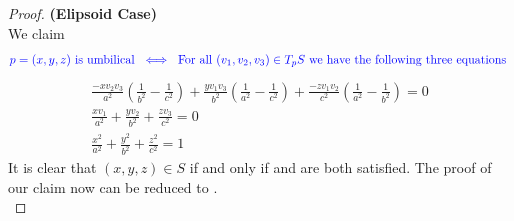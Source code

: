 \documentclass{report}
\begin{document}
\begin{proof}
\textbf{(Elipsoid Case)}\\

We claim 
\begin{align*}
  \textcolor{blue}{p=(x,y,z)\text{ is umbilical }\iff \text{ For all $(v_1,v_2,v_3)\in T_pS$ we have the following three equations }}
\end{align*}
\begin{align}
  \frac{-x v_2v_3}{a^2}(\frac{1}{b^2}-\frac{1}{c^2})+ \frac{yv_1v_3}{b^2}(\frac{1}{a^2}-\frac{1}{c^2})+ \frac{-zv_1v_2}{c^2}(\frac{1}{a^2}-\frac{1}{b^2})=0\label{eq1}\\
  \frac{xv_1}{a^2}+\frac{yv_2}{b^2}+ \frac{zv_3}{c^2}=0\label{eq2}\\
  \frac{x^2}{a^2}+ \frac{y^2}{b^2}+ \frac{z^2}{c^2}=1\label{eq3}
\end{align}
It is clear that $(x,y,z) \in S$ if and only if  and  are both satisfied. The proof of our claim now can be reduced to .\\


\end{proof}
\end{document}
